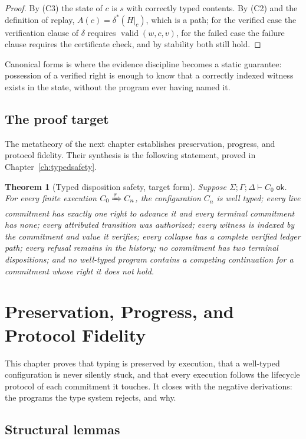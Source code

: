 \documentclass[11pt,openany]{book}
\newtheorem{theorem}{Theorem}[chapter]
\theoremstyle{remark}
\newcommand{\valid}{\operatorname{valid}}
\begin{document}
\begin{proof}
By (C3) the state of $c$ is $s$ with correctly typed contents. By (C2) and
the definition of replay, $A(c)=\delta^{*}(H|_c)$, which is a path; for
the verified case the verification clause of $\delta$ requires
$\valid(w,c,v)$, for the failed case the failure clause requires the
certificate check, and by stability both still hold.
\end{proof}

Canonical forms is where the evidence discipline becomes a static
guarantee: possession of a verified right is enough to know that a
correctly indexed witness exists in the state, without the program ever
having named it.

\section{The proof target}

The metatheory of the next chapter establishes preservation, progress, and
protocol fidelity. Their synthesis is the following statement, proved in
Chapter~\ref{ch:typedsafety}.

\begin{theorem}[Typed disposition safety, target form]
Suppose $\Sigma;\Gamma;\Delta\vdash C_0\;\mathsf{ok}$. For every finite
execution $C_0\xRightarrow{\tau}C_n$, the configuration $C_n$ is well
typed; every live commitment has exactly one right to advance it and every
terminal commitment has none; every attributed transition was authorized;
every witness is indexed by the commitment and value it verifies; every
collapse has a complete verified ledger path; every refusal remains in the
history; no commitment has two terminal dispositions; and no well-typed
program contains a competing continuation for a commitment whose right it
does not hold.
\end{theorem}

\chapter{Preservation, Progress, and Protocol Fidelity}
\label{ch:session}

This chapter proves that typing is preserved by execution, that a
well-typed configuration is never silently stuck, and that every execution
follows the lifecycle protocol of each commitment it touches. It closes
with the negative derivations: the programs the type system rejects, and
why.

\section{Structural lemmas}
\end{document}
